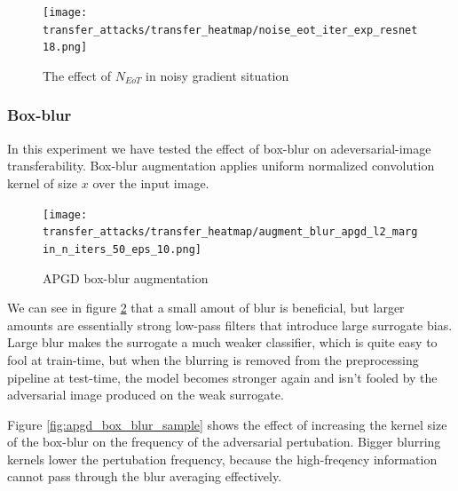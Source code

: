 \begin{figure}
    \centering
    \texttt{[image: transfer\_attacks/transfer\_heatmap/noise\_eot\_iter\_exp\_resnet18.png]}
    \caption{The effect of $N_{EoT}$ in noisy gradient situation}
    \label{fig:noise_eot_iter}
\end{figure}



\subsubsection{Box-blur}
In this experiment we have tested the effect of box-blur on adeversarial-image transferability. Box-blur augmentation applies uniform normalized convolution kernel of size $x$ over the input image. 

\begin{figure}
    \centering
    \texttt{[image: transfer\_attacks/transfer\_heatmap/augment\_blur\_apgd\_l2\_margin\_n\_iters\_50\_eps\_10.png]}
    \caption{APGD box-blur augmentation}
    \label{fig:apgd_box_blur}
\end{figure}

We can see in figure \ref{fig:apgd_box_blur} that a small amout of blur is beneficial, but larger amounts are essentially strong low-pass filters that introduce large surrogate bias. Large blur makes the surrogate a much weaker classifier, which is quite easy to fool at train-time, but when the blurring is removed from the preprocessing pipeline at test-time, the model becomes stronger again and isn't fooled by the adversarial image produced on the weak surrogate.

Figure \ref{fig:apgd_box_blur_sample} shows the effect of increasing the kernel size of the box-blur on the frequency of the adversarial pertubation. Bigger blurring kernels lower the pertubation frequency, because the high-freqency information cannot pass through the blur averaging effectively.


